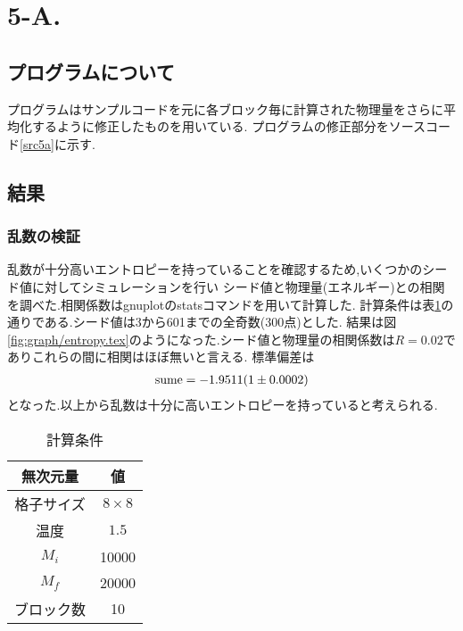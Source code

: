 \section{5-A.}
\subsection{プログラムについて}
プログラムはサンプルコードを元に各ブロック毎に計算された物理量をさらに平均化するように修正したものを用いている.
プログラムの修正部分をソースコード\ref{src5a}に示す.
\subsection{結果}
\subsubsection{乱数の検証}
乱数が十分高いエントロピーを持っていることを確認するため,いくつかのシード値に対してシミュレーションを行い
シード値と物理量(エネルギー)との相関を調べた.相関係数はgnuplotのstatsコマンドを用いて計算した.
計算条件は表\ref{tab:5a1}の通りである.シード値は3から601までの全奇数(300点)とした.
結果は図\ref{fig:graph/entropy.tex}のようになった.シード値と物理量の相関係数は$R=0.02$でありこれらの間に相関はほぼ無いと言える.
標準偏差は
\begin{align}
  {\rm sume}=-1.9511(1\pm0.0002)
\end{align}
となった.以上から乱数は十分に高いエントロピーを持っていると考えられる.
\begin{table}[h]
  \caption{計算条件}
  \label{tab:5a1}
  \centering
  \begin{tabular}{cc}
    \hline
    無次元量&値\\
    \hline \hline
    格子サイズ&$8\times 8$\\
    温度&$1.5$\\
    $M_i$&10000\\
    $M_f$&20000\\
    ブロック数&10\\
    \hline
  \end{tabular}
\end{table}
\clearpage
